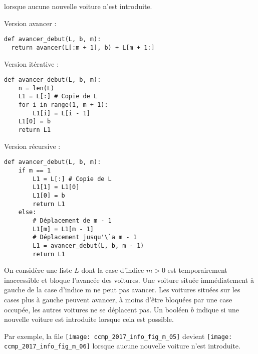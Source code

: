 lorsque aucune nouvelle voiture n'est introduite.

\fi


\ifprof
\begin{corrige}
Version avancer :
\begin{lstlisting}
def avancer_debut(L, b, m):
  return avancer(L[:m + 1], b) + L[m + 1:]
\end{lstlisting}

Version itérative :
\begin{lstlisting}
def avancer_debut(L, b, m):
    n = len(L)
    L1 = L[:] # Copie de L
    for i in range(1, m + 1):
        L1[i] = L[i - 1]
    L1[0] = b
    return L1
\end{lstlisting}



Version récursive : 
\begin{lstlisting}
def avancer_debut(L, b, m):
    if m == 1
        L1 = L[:] # Copie de L
        L1[1] = L1[0]
        L1[0] = b
        return L1
    else:
        # Déplacement de m - 1
        L1[m] = L1[m - 1]   
        # Déplacement jusqu'\`a m - 1
        L1 = avancer_debut(L, b, m - 1) 
        return L1
\end{lstlisting}
\end{corrige}
\else
\fi

\ifprof
\else

On considère une liste $L$ dont la case d'indice $m > 0$ est temporairement inaccessible et
bloque l'avancée des voitures. Une voiture située immédiatement à gauche de la case d'indice m ne
peut pas avancer. Les voitures situées sur les cases plus à gauche peuvent avancer, à moins d'être
bloquées par une case occupée, les autres voitures ne se déplacent pas. Un booléen $b$ indique si une
nouvelle voiture est introduite lorsque cela est possible.

Par exemple, la file \texttt{[image: ccmp\_2017\_info\_fig\_m\_05]}
 devient \texttt{[image: ccmp\_2017\_info\_fig\_m\_06]}
lorsque aucune nouvelle voiture n'est introduite.
\fi

